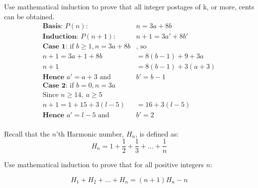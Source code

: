 \documentclass[landscape, letterpaper, 8pt]{extarticle}
\begin{document}
\begin{multicols}{3}
\begin{example}
        Use mathematical induction to prove that all integer postages of k, or more, cents can be
        obtained.
        \begin{equation*}
            \begin{aligned}
                \textbf{Basis: } P(n):                             & n = 3a + 8b       \\
                \textbf{Induction: } P(n+1):                       & n+1 = 3a' + 8b'   \\
                \textbf{Case 1: } \text{if } b \geq 1, n = 3a + 8b & \text{, so}       \\
                n+1 = 3a+1+8b                                      & = 8(b-1) + 9 + 3a \\
                n+1                                                & = 8(b-1) +3(a+3)  \\
                \textbf{Hence }a' = a+3      \text{ and }          & b' = b - 1        \\
                \textbf{Case 2: } \text{if } b = 0, n = 3a         &                   \\
                \text{Since }n \geq 14,~a \geq 5                                       \\
                n+1 = 1 + 15 + 3(l-5)                              & = 16+ 3(l-5)      \\
                \textbf{Hence }a' = l-5      \text{ and }          & b' = 2            \\
            \end{aligned}
        \end{equation*}
    \end{example}
    \begin{example}
        Recall that the $n$'th Harmonic number, $H_n$, is defined as:
        $$
            H_n = 1+ \frac{1}{2} + \frac{1}{3} + \ldots + \frac{1}{n}
        $$

        Use mathematical induction to prove that for all positive integers $n$:

        $$
            H_1 + H_2 + \ldots + H_n = (n+1)H_n -n
        $$


\end{example}
\end{multicols}
\end{document}
